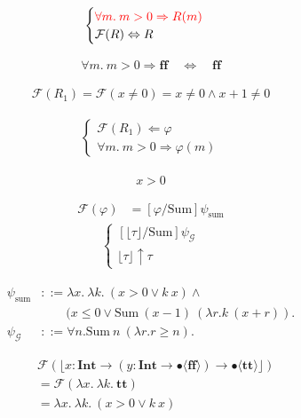 \documentclass{jarticle}
\theoremstyle{definition}
\newcommand \goal {\psi}
\newcommand \true {\textbf{tt}}
\newcommand \false {\textbf{ff}}
\newcommand \stypeint {\textbf{Int}}
\newcommand \stypebool {\bullet}
\newcommand \typeint[1]{{#1} : \stypeint}
\newcommand \typebool[1]{\stypebool \langle #1 \rangle}
\newcommand \ti[1]{\typeint{#1}}
\newcommand \tb[1]{\typebool{#1}}
\newcommand {\pdrtop} {\psi_{\mathcal{G}}}
\newcommand {\pdrtransform} {\mathcal{F}}
\newcommand {\pdrF} {\pdrtransform}
\newcommand {\floor}[1] {\lfloor #1 \rfloor }
\newcommand {\pdrtypes} {\uparrow}
\begin{document}
\begin{align*}
    \begin{cases}
        { \color{red} \forall m.\: m > 0 \Rightarrow R(m) }\\
        \pdrF(R) \Leftrightarrow R
    \end{cases}
\end{align*}

\begin{align*}
    \forall m.\: m > 0 \Rightarrow \false  \quad \Leftrightarrow \quad \false
\end{align*}

\begin{align*}
    \pdrF(R_1) = \pdrF(x \neq 0) = x \neq 0 \wedge x + 1 \neq 0
\end{align*}

\begin{align*}
    \begin{cases}
        \pdrF(R_1) \Leftarrow \varphi \\
        \forall m.\: m > 0 \Rightarrow \varphi(m)
    \end{cases}
\end{align*}

\begin{align*}
x > 0
\end{align*}

\begin{align*}
    \pdrF(\varphi) &= [\varphi/\text{Sum}]\goal_{\text{sum}}
\end{align*}
\begin{align*}
    \begin{cases}
        [\floor{\tau}/\text{Sum}]\pdrtop \\
        \floor{\tau} \pdrtypes \tau
    \end{cases}
\end{align*}

\begin{align*}
    \goal_{\text{sum}} &::= \lambda x.\: \lambda k.\: (x > 0 \lor k\ x) \land \\
                     &\quad\quad  (x \leq 0 \lor \text{Sum}\ (x - 1)\ (\lambda r. k\ (x + r)).\\
    \pdrtop &::= \forall n. \text{Sum}\ n\ (\lambda r. r \geq n).
\end{align*}

\begin{align*}
    &\pdrF(\floor{\ti{x} \to (\ti{y} \to \tb{\false}) \to \tb{\true}}) \\
    &=\pdrF(\lambda x.\: \lambda k.\: \true) \\
    &= \lambda x.\: \lambda k.\: (x > 0 \lor k\ x)
\end{align*}
\end{document}
